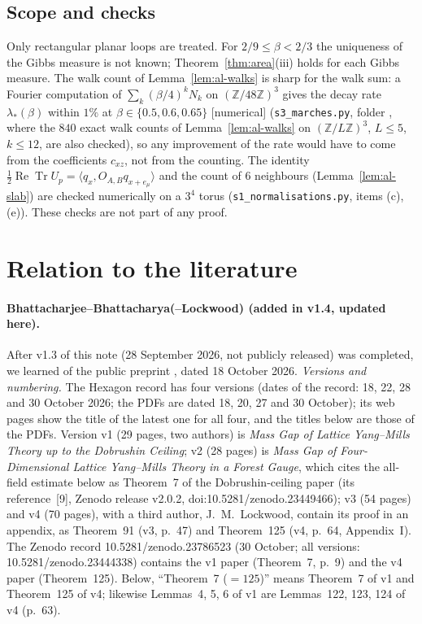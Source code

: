 \documentclass[11pt,a4paper]{article}
\theoremstyle{remark}
\theoremstyle{definition}
\theoremstyle{plain}
\theoremstyle{remark}
\newcommand{\Z}{\mathbb{Z}}
\newcommand{\ReTr}{\operatorname{Re}\operatorname{Tr}}
\newcommand{\st}[1]{\textsf{[#1]}}
\begin{document}
\subsection{Scope and checks}\label{sec:areanum}

Only rectangular planar loops are treated. For $2/9\le\beta<2/3$ the uniqueness of the Gibbs measure is not known; Theorem~\ref{thm:area}(iii) holds for each Gibbs measure. The walk count of Lemma~\ref{lem:al-walks} is sharp for the walk sum: a Fourier computation of $\sum_k(\beta/4)^kN_k$ on $(\Z/48\Z)^3$ gives the decay rate $\lambda_*(\beta)$ within $1\%$ at $\beta\in\{0.5,0.6,0.65\}$ \st{numerical} (\texttt{s3\_marches.py}, folder , where the $840$ exact walk counts of Lemma~\ref{lem:al-walks} on $(\Z/L\Z)^3$, $L\le5$, $k\le12$, are also checked), so any improvement of the rate would have to come from the coefficients $c_{xz}$, not from the counting. The identity $\frac12\ReTr U_p=\langle q_x,O_{A,B}q_{x+e_\mu}\rangle$ and the count of $6$ neighbours (Lemma~\ref{lem:al-slab}) are checked numerically on a $3^4$ torus (\texttt{s1\_normalisations.py}, items (c), (e)). These checks are not part of any proof.

\section{Relation to the literature}\label{sec:lit}

\paragraph{Bhattacharjee--Bhattacharya(--Lockwood) \cite{BB26} (added in v1.4, updated here).} After v1.3 of this note
(28 September 2026, not publicly released) was completed, we learned of the public preprint \cite{BB26}, dated 18 October 2026.
\emph{Versions and numbering.} The Hexagon record has four versions (dates of the record: 18, 22, 28 and 30 October 2026; the PDFs are dated 18, 20, 27 and 30 October); its web pages show the title of the latest one for all four, and the titles below are those of the PDFs.
Version v1 (29 pages, two authors) is \emph{Mass Gap of Lattice Yang--Mills Theory up to the Dobrushin Ceiling}; v2 (28 pages) is
\emph{Mass Gap of Four-Dimensional Lattice Yang--Mills Theory in a Forest Gauge}, which cites the all-field estimate below as Theorem~7 of the Dobrushin-ceiling paper (its reference~[9], Zenodo release v2.0.2, doi:10.5281/zenodo.23449466); v3 (54 pages) and v4 (70 pages), with a third author, J.~M.~Lockwood,
contain its proof in an appendix, as Theorem~91 (v3, p.~47) and Theorem~125 (v4, p.~64, Appendix~I). The Zenodo record 10.5281/zenodo.23786523 (30 October; all versions: 10.5281/zenodo.23444338) contains the v1 paper
(Theorem~7, p.~9) and the v4 paper (Theorem~125). Below, ``Theorem~7 ($=125$)'' means Theorem~7 of v1 and Theorem~125 of v4; likewise Lemmas~4, 5, 6 of v1 are Lemmas~122, 123, 124 of v4 (p.~63).
\end{document}
